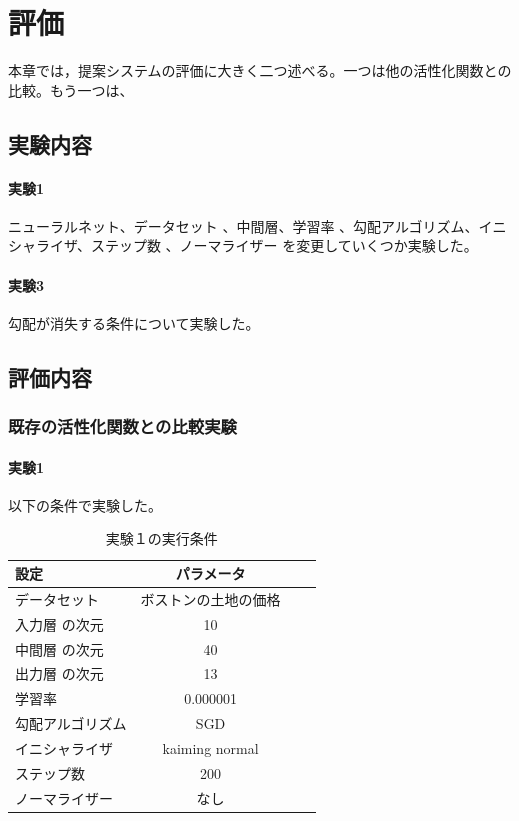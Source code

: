 \chapter{評価}
\label{evaluation}
本章では，提案システムの評価に大きく二つ述べる。一つは他の活性化関数との比較。もう一つは、

\section{実験内容}
\subsubsection{実験1}

ニューラルネット、データセット 、中間層、学習率 、勾配アルゴリズム、イニシャライザ、ステップ数 、ノーマライザー
を変更していくつか実験した。

\subsubsection{実験3}
勾配が消失する条件について実験した。




\section{評価内容}



\subsection{既存の活性化関数との比較実験}



\subsubsection{実験1}

以下の条件で実験した。

\begin{table}[htbp]
    \begin{center}
        \caption{実験１の実行条件}
        \begin{tabular}{l*{2}{c}r}
        設定              & パラメータ \\
        \hline
        データセット            & ボストンの土地の価格 \\
        入力層 の次元            & 10 \\
        中間層 の次元            & 40 \\
        出力層 の次元            & 13 \\
        学習率              & 0.000001 \\
        勾配アルゴリズム       & SGD \\
        イニシャライザ               & kaiming normal \\
        ステップ数        & 200 \\
        ノーマライザー           & なし \\
        \end{tabular}
    \end{center}
\end{table}


